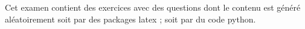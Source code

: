 
Cet examen contient des exercices avec des questions dont le contenu
est généré aléatoirement soit par des packages latex ; soit par du
code python.
